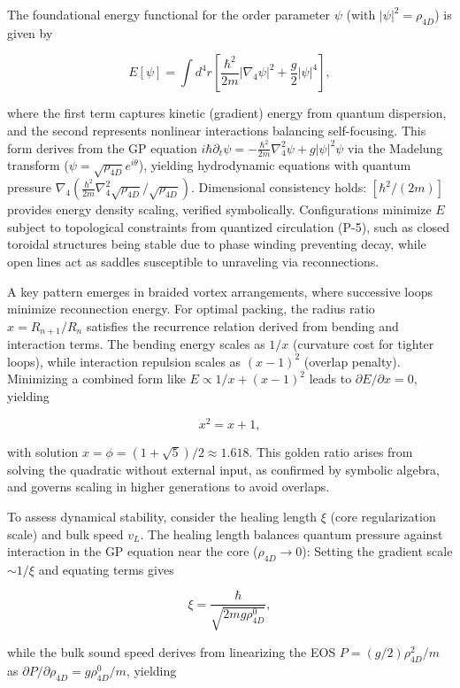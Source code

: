 The foundational energy functional for the order parameter $\psi$ (with $|\psi|^2 = \rho_{4D}$) is given by

\[
E[\psi] = \int d^4 r \left[ \frac{\hbar^2}{2m} |\nabla_4 \psi|^2 + \frac{g}{2} |\psi|^4 \right],
\]

where the first term captures kinetic (gradient) energy from quantum dispersion, and the second represents nonlinear interactions balancing self-focusing. This form derives from the GP equation $i \hbar \partial_t \psi = -\frac{\hbar^2}{2 m} \nabla_4^2 \psi + g |\psi|^2 \psi$ via the Madelung transform ($\psi = \sqrt{\rho_{4D}} e^{i \theta}$), yielding hydrodynamic equations with quantum pressure $\nabla_4 (\frac{\hbar^2}{2 m} \nabla_4^2 \sqrt{\rho_{4D}} / \sqrt{\rho_{4D}})$. Dimensional consistency holds: $[\hbar^2 / (2m)]$ provides energy density scaling, verified symbolically. Configurations minimize $E$ subject to topological constraints from quantized circulation (P-5), such as closed toroidal structures being stable due to phase winding preventing decay, while open lines act as saddles susceptible to unraveling via reconnections.

A key pattern emerges in braided vortex arrangements, where successive loops minimize reconnection energy. For optimal packing, the radius ratio $x = R_{n+1}/R_n$ satisfies the recurrence relation derived from bending and interaction terms. The bending energy scales as $1/x$ (curvature cost for tighter loops), while interaction repulsion scales as $(x - 1)^2$ (overlap penalty). Minimizing a combined form like $E \propto 1/x + (x - 1)^2$ leads to $\partial E / \partial x = 0$, yielding

\[
x^2 = x + 1,
\]

with solution $x = \phi = (1 + \sqrt{5})/2 \approx 1.618$. This golden ratio arises from solving the quadratic without external input, as confirmed by symbolic algebra, and governs scaling in higher generations to avoid overlaps.

To assess dynamical stability, consider the healing length $\xi$ (core regularization scale) and bulk speed $v_L$. The healing length balances quantum pressure against interaction in the GP equation near the core ($\rho_{4D} \to 0$): Setting the gradient scale $\sim 1/\xi$ and equating terms gives

\[
\xi = \frac{\hbar}{\sqrt{2 m g \rho_{4D}^0}},
\]

while the bulk sound speed derives from linearizing the EOS $P = (g/2) \rho_{4D}^2 / m$ as $\partial P / \partial \rho_{4D} = g \rho_{4D}^0 / m$, yielding

